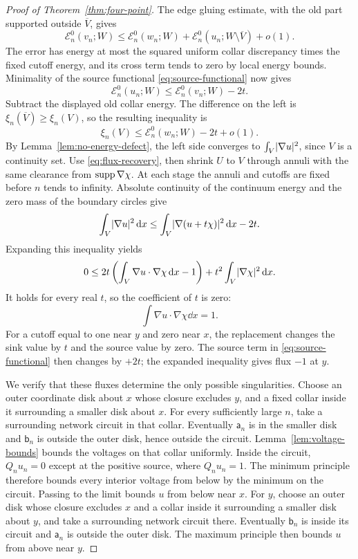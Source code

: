 \begin{proof}[Proof of Theorem~\ref{thm:four-point}]
The edge gluing estimate, with the old part supported outside
\(\overline V\), gives
\[
 \mathcal E_n^0(v_n;W)
 \le \mathcal E_n^0(w_n;W)
       +\mathcal E_n^0(u_n;W\setminus\overline V)+o(1).
\]
The error has energy at most the squared uniform collar discrepancy times
the fixed cutoff energy, and its cross term tends to zero by local energy
bounds.  Minimality of the source functional
\eqref{eq:source-functional} now gives
\[
 \mathcal E_n^0(u_n;W)
       \le\mathcal E_n^0(v_n;W)-2t.
\]
Subtract the displayed old collar energy.  The difference on the left is
\(\xi_n(\overline V)\ge\xi_n(V)\), so the resulting inequality is
\[
                  \xi_n(V)
                  \le\mathcal E_n^0(w_n;W)-2t+o(1).
\]
By Lemma~\ref{lem:no-energy-defect}, the left side converges to
\(\int_V\lvert \nabla u\rvert^2\), since \(V\) is a continuity set.
Use \eqref{eq:flux-recovery}, then shrink \(U\) to \(V\) through annuli
with the same clearance from \(\operatorname{supp}\nabla\chi\).  At each stage the
annuli and cutoffs are fixed before \(n\) tends to infinity.  Absolute
continuity of the continuum energy and the zero mass of the boundary
circles give
\begin{equation}\label{eq:flux-variation}
 \int_V\lvert \nabla u\rvert^2\,\mathrm d x
 \le\int_V\lvert \nabla(u+t\chi)\rvert^2\,\mathrm d x-2t.
\end{equation}
Expanding this inequality yields
\[
 0\le
 2t\left(\int_V\nabla u\cdot\nabla\chi\,\mathrm d x-1\right)
       +t^2\int_V\lvert \nabla\chi\rvert^2\,\mathrm d x.
\]
It holds for every real \(t\), so the coefficient of \(t\) is zero:
\begin{equation}\label{eq:unit-source-flux}
                     \int\nabla u\cdot\nabla\chi\dd x=1.
\end{equation}
For a cutoff equal to one near \(y\) and zero near \(x\), the replacement
changes the sink value by \(t\) and the source value by zero.
The source term in \eqref{eq:source-functional} then changes by \(+2t\);
the expanded inequality gives flux \(-1\) at \(y\).

We verify that these fluxes determine the only possible singularities.
Choose an outer coordinate disk about \(x\) whose closure excludes \(y\),
and a fixed collar inside it surrounding a smaller disk about \(x\).
For every sufficiently large \(n\), take a surrounding network circuit
in that collar.  Eventually
\(\mathsf a_n\) is in the smaller disk and \(\mathsf b_n\) is outside
the outer disk, hence outside the circuit.
Lemma~\ref{lem:voltage-bounds} bounds the voltages on that collar
uniformly.  Inside the circuit, \(Q_nu_n=0\) except at the positive
source, where \(Q_nu_n=1\).  The minimum principle therefore
bounds every interior voltage from below by the minimum on the circuit.
Passing to the limit bounds \(u\) from below near \(x\).  For \(y\),
choose an outer disk whose closure excludes \(x\) and a collar inside
it surrounding a smaller disk about \(y\), and take a surrounding
network circuit there.  Eventually \(\mathsf b_n\)
is inside its circuit and \(\mathsf a_n\) is outside the outer disk.
The maximum principle then bounds \(u\) from above near \(y\).


\end{proof}
